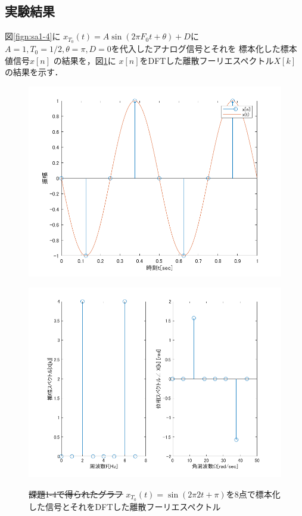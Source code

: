 \documentclass[11pt, a4paper, titlepage]{ltjsarticle}
\begin{document}
\subsection*{実験結果}
図\ref*{fign:sa1-4}に
$x_{T_{0}}(t)=A\sin(2\pi F_{0}t+\theta)+ D$に
$A=1,T_{0}=1/2,\theta=\pi,D=0$を代入したアナログ信号とそれを
標本化した標本値信号$x[n]$
の結果を，図\ref*{fign:sp1-4}に
$x[n]$をDFTした離散フーリエスペクトル$X[k]$
の結果を示す．
\begin{figure}[h]
\begin{center}
\begin{minipage}[t]{0.48\columnwidth}
    \includegraphics[width=\columnwidth]{figures/sampling1-4.png}
    \label{fign:sa1-4}
\end{minipage}
\begin{minipage}[t]{0.48\columnwidth}
    \includegraphics[width=\columnwidth]{figures/spectrum1-4.png}
    \label{fign:sp1-4}
\end{minipage}
\end{center}
\caption{\sout{課題1-4で得られたグラフ}
$x_{T_{0}}(t)=\sin(2\pi 2t+\pi)$を8点で標本化した信号とそれをDFTした離散フーリエスペクトル}
\end{figure}
\end{document}
